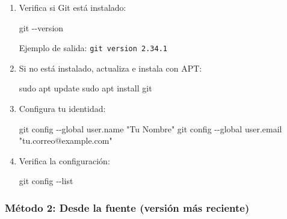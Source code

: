 \documentclass[
  doc,
  floatsintext,
  longtable,
  a4paper,
  nolmodern,
  notxfonts,
  notimes,
  colorlinks=true,linkcolor=blue,citecolor=blue,urlcolor=blue]{apa7}
\newenvironment{Shaded}{\begin{snugshade}}{\end{snugshade}}
\newcommand{\AttributeTok}[1]{\textcolor[rgb]{0.40,0.45,0.13}{#1}}
\newcommand{\FunctionTok}[1]{\textcolor[rgb]{0.28,0.35,0.67}{#1}}
\newcommand{\NormalTok}[1]{\textcolor[rgb]{0.00,0.23,0.31}{#1}}
\newcommand{\StringTok}[1]{\textcolor[rgb]{0.13,0.47,0.30}{#1}}
\begin{document}
\begin{enumerate}
\def\labelenumi{\arabic{enumi}.}
\item
  Verifica si Git está instalado:

\begin{Shaded}
\begin{Highlighting}[]
\FunctionTok{git} \AttributeTok{{-}{-}version}
\end{Highlighting}
\end{Shaded}

  Ejemplo de salida: \texttt{git\ version\ 2.34.1}
\item
  Si no está instalado, actualiza e instala con APT:

\begin{Shaded}
\begin{Highlighting}[]
\FunctionTok{sudo}\NormalTok{ apt update}
\FunctionTok{sudo}\NormalTok{ apt install git}
\end{Highlighting}
\end{Shaded}
\item
  Configura tu identidad:

\begin{Shaded}
\begin{Highlighting}[]
\FunctionTok{git}\NormalTok{ config }\AttributeTok{{-}{-}global}\NormalTok{ user.name }\StringTok{"Tu Nombre"}
\FunctionTok{git}\NormalTok{ config }\AttributeTok{{-}{-}global}\NormalTok{ user.email }\StringTok{"tu.correo@example.com"}
\end{Highlighting}
\end{Shaded}
\item
  Verifica la configuración:

\begin{Shaded}
\begin{Highlighting}[]
\FunctionTok{git}\NormalTok{ config }\AttributeTok{{-}{-}list}
\end{Highlighting}
\end{Shaded}
\end{enumerate}

\subsubsection{Método 2: Desde la fuente (versión más
reciente)}\label{muxe9todo-2-desde-la-fuente-versiuxf3n-muxe1s-reciente}
\end{document}
